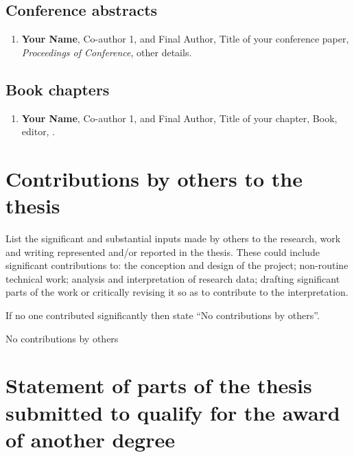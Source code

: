 \subsection*{Conference abstracts}

\begin{enumerate}

\item \cite{citationkey} \textbf{Your Name}, Co-author 1, and Final Author, Title of your conference paper, \textit{Proceedings of Conference}, other details.

\end{enumerate}

\subsection*{Book chapters}

\begin{enumerate}

\item \cite{citationkey} \textbf{Your Name}, Co-author 1, and Final Author, Title of your chapter, Book, editor, \etc{}.

\end{enumerate}

\section*{Contributions by others to the thesis}

\begin{instructional}
	List the significant and substantial inputs made by others to the research, work and writing represented and/or reported in the thesis. These could include significant contributions to: the conception and design of the project; non-routine technical work; analysis and interpretation of research data; drafting significant parts of the work or critically revising it so as to contribute to the interpretation. 

	If no one contributed significantly then state ``No contributions by others''.
\end{instructional}

No contributions by others

\section*{Statement of parts of the thesis submitted to qualify for the award of another degree}

